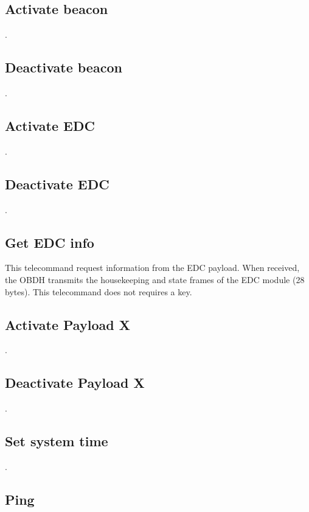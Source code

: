 \subsection{Activate beacon}

.

\subsection{Deactivate beacon}

.

\subsection{Activate EDC}

.

\subsection{Deactivate EDC}

.

\subsection{Get EDC info}

This telecommand request information from the EDC payload. When received, the OBDH transmits the housekeeping and state frames of the EDC module (28 bytes). This telecommand does not requires a key.

\subsection{Activate Payload X}

.

\subsection{Deactivate Payload X}

.

\subsection{Set system time}

.

\subsection{Ping}

